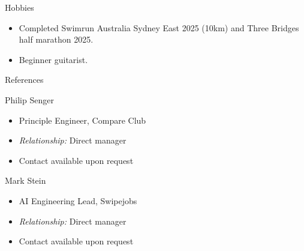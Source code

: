 \documentclass[]{mcdowellcv}
\begin{document}
\begin{cvsection}{Hobbies}

\begin{cvsubsection}{}{}{}
\begin{itemize}
\item Completed Swimrun Australia Sydney East 2025 (10km) and Three Bridges half marathon 2025.
\item Beginner guitarist.
\end{itemize}
\end{cvsubsection}

\end{cvsection}

\begin{cvsection}{References}

\begin{cvsubsection}{Philip Senger}{}{}
\begin{itemize}
\item Principle Engineer, Compare Club
\item \textit{Relationship:} Direct manager
\item Contact available upon request
\end{itemize}
\end{cvsubsection}

\begin{cvsubsection}{Mark Stein}{}{}
\begin{itemize}
\item AI Engineering Lead, Swipejobs
\item \textit{Relationship:} Direct manager
\item Contact available upon request
\end{itemize}
\end{cvsubsection}

\end{cvsection}
\end{document}
